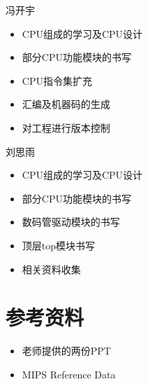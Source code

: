 \documentclass[UTF8]{article}
\begin{document}
冯开宇
\begin{itemize}
    \item CPU组成的学习及CPU设计
    \item 部分CPU功能模块的书写
    \item CPU指令集扩充
\item 汇编及机器码的生成
\item 对工程进行版本控制
\end{itemize}


刘思雨
\begin{itemize}
\item CPU组成的学习及CPU设计
\item 部分CPU功能模块的书写
\item 数码管驱动模块的书写
\item 顶层top模块书写
\item 相关资料收集
\end{itemize}

\section{参考资料}

\begin{itemize}
    \item 老师提供的两份PPT
    \item MIPS Reference Data
\end{itemize}
\end{document}
